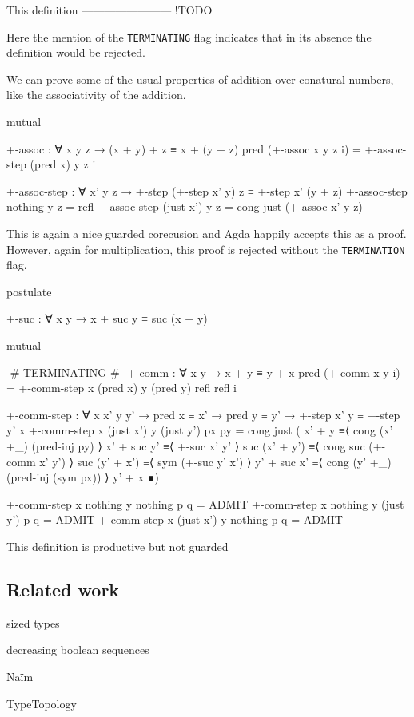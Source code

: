 This definition ------------------------ !TODO

Here the mention of the \texttt{TERMINATING} flag indicates that in its absence the definition would be rejected.

We can prove some of the usual properties of addition over conatural numbers, like the associativity of the addition.

\begin{code}[hide]
mutual
\end{code}
\begin{code}
  +-assoc : ∀ x y z → (x + y) + z ≡ x + (y + z)
  pred (+-assoc x y z i) = +-assoc-step (pred x) y z i

  +-assoc-step :
    ∀ x' y z →
    +-step (+-step x' y) z ≡ +-step x' (y + z)
  +-assoc-step nothing    y z = refl
  +-assoc-step (just x')  y z = cong just (+-assoc x' y z)
\end{code}

This is again a nice guarded corecusion and Agda happily accepts this as a proof. However, again for multiplication, this proof is rejected without the \texttt{TERMINATION} flag.

\begin{code}[hide]
postulate
\end{code}
\begin{code}
  +-suc : ∀ x y → x + suc y ≡ suc (x + y)
\end{code}

\begin{code}[hide]
mutual
\end{code}
\begin{code}
  {-# TERMINATING #-}
  +-comm : ∀ x y → x + y ≡ y + x
  pred (+-comm x y i) =
    +-comm-step x (pred x) y (pred y) refl refl i

  +-comm-step :
    ∀ x x' y y' → pred x ≡ x' → pred y ≡ y' →
    +-step x' y ≡ +-step y' x
  +-comm-step x (just x') y (just y') px py =
    cong just
      ( x' + y         ≡⟨ cong (x' +_) (pred-inj py) ⟩
        x' + suc y'    ≡⟨ +-suc x' y' ⟩
        suc (x' + y')  ≡⟨ cong suc (+-comm x' y') ⟩
        suc (y' + x')  ≡⟨ sym (+-suc y' x') ⟩
        y' + suc x'    ≡⟨ cong (y' +_) (pred-inj (sym px)) ⟩
        y' + x         ∎)
\end{code}
\begin{code}[hide]
  +-comm-step x nothing y nothing p q = ADMIT
  +-comm-step x nothing y (just y') p q = ADMIT
  +-comm-step x (just x') y nothing p q = ADMIT
\end{code}

This definition is productive but not guarded

\subsection{Related work}

sized types

decreasing boolean sequences

Naïm

TypeTopology
